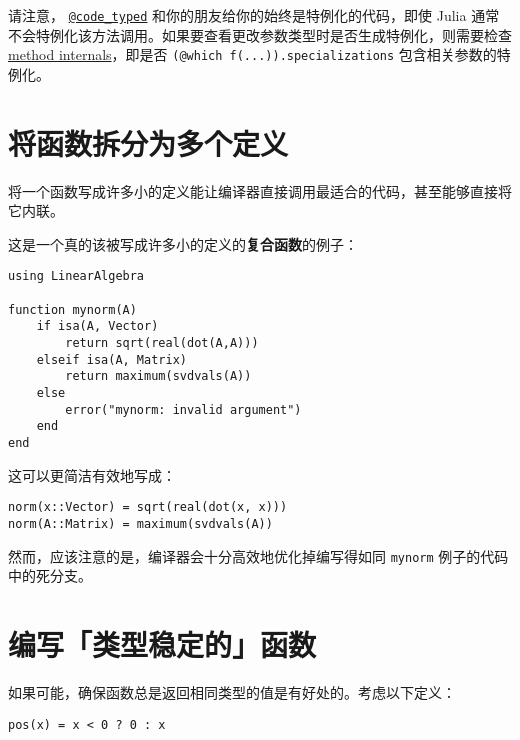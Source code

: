 请注意， \hyperlink{6823997547688846780}{\texttt{@code\_typed}} 和你的朋友给你的始终是特例化的代码，即使 Julia 通常不会特例化该方法调用。如果要查看更改参数类型时是否生成特例化，则需要检查 \hyperlink{5484310955311811443}{method internals}，即是否 \texttt{(@which f(...)).specializations} 包含相关参数的特例化。



\hypertarget{5154687489987486672}{}


\section{将函数拆分为多个定义}



将一个函数写成许多小的定义能让编译器直接调用最适合的代码，甚至能够直接将它内联。



这是一个真的该被写成许多小的定义的\textbf{复合函数}的例子：




\begin{verbatim}
using LinearAlgebra

function mynorm(A)
    if isa(A, Vector)
        return sqrt(real(dot(A,A)))
    elseif isa(A, Matrix)
        return maximum(svdvals(A))
    else
        error("mynorm: invalid argument")
    end
end
\end{verbatim}



这可以更简洁有效地写成：




\begin{verbatim}
norm(x::Vector) = sqrt(real(dot(x, x)))
norm(A::Matrix) = maximum(svdvals(A))
\end{verbatim}



然而，应该注意的是，编译器会十分高效地优化掉编写得如同 \texttt{mynorm} 例子的代码中的死分支。



\hypertarget{11831339210471490014}{}


\section{编写「类型稳定的」函数}



如果可能，确保函数总是返回相同类型的值是有好处的。考虑以下定义：




\begin{verbatim}
pos(x) = x < 0 ? 0 : x
\end{verbatim}



